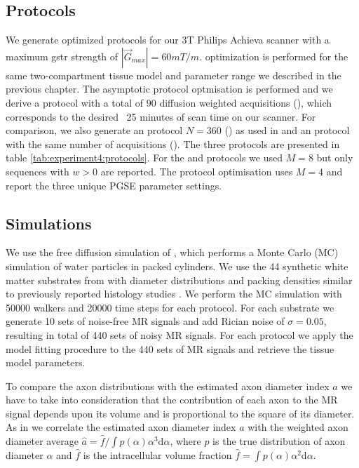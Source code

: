 \subsection{Protocols}
We generate optimized protocols for our 3T Philips Achieva scanner with a maximum {\gls{gstr}} strength of $|\vec{G}_{max}|=60mT/m$. \SFasym{} optimization is performed for the same two-compartment tissue model and parameter range we described in the previous chapter. The asymptotic \SFasym protocol optmisation is performed and we derive a protocol with a total of $90$ diffusion weighted acquisitions (\SFshort), which corresponds to the desired ~25 minutes of scan time on our scanner. For comparison, we also generate an \OI protocol $N=360$ (\OIlong) as used in \citep{Alexander:2010} and an \SFasym protocol with the same number of acquisitions (\SFlong). The three protocols are presented in table \ref{tab:experiment4:protocols}. For the \SFshort{} and \SFlong{} protocols we used $M=8$ but only sequences with $w>0$ are reported. The \OIlong{} protocol optimisation uses $M=4$ and report the three unique {\gls{PGSE}} parameter settings.
\subsection{Simulations}
We use the free diffusion simulation of \citet{Hall:2009}, which performs a Monte Carlo (MC) simulation of water particles in packed cylinders. We use the 44 synthetic white matter substrates from\citet{Alexander:2010} with diameter distributions and packing densities similar to previously reported histology studies \citep{GrafvonKeyserlingk:1984,LaMantia:1990,Aboitiz:1992}.%
We perform the MC simulation with 50000 walkers and 20000 time steps for each protocol. For each substrate we generate 10 sets of noise-free MR signals and add Rician noise of $\sigma=0.05$, resulting in  total of 440 sets of noisy MR signals. For each protocol we apply the model fitting procedure to the 440 sets of MR signals and retrieve the tissue model parameters.

To compare the axon distributions with the estimated axon diameter index $a$ we have to take into consideration that the contribution of each axon to the MR signal depends upon its volume and is proportional to the square of its diameter. As in \citet{Alexander:2010} we correlate the estimated axon diameter index $a$ with the weighted axon diameter average $\hat{a} = \hat{f} / \int p(\alpha)\alpha^3\mbox{d}\alpha$, where $p$ is the true distribution of axon diameter $\alpha$ and $\hat{f}$ is the intracellular volume fraction $\hat{f} = \int p(\alpha)\alpha^2\mbox{d}\alpha.$

